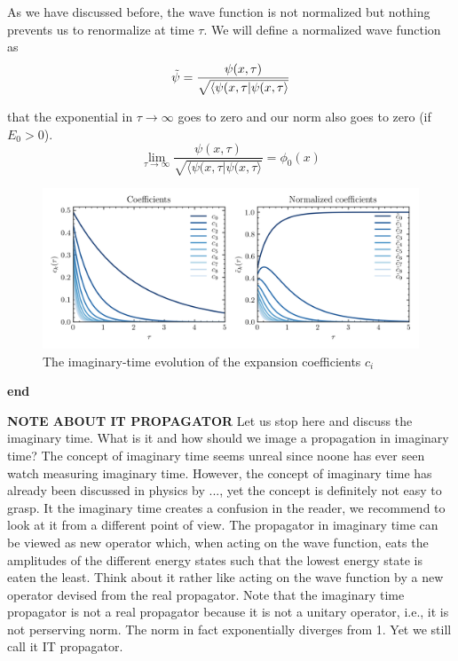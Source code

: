 As we have discussed before, the wave function is not normalized but nothing prevents us to renormalize at time $\tau$. We will define a normalized wave function as
\begin{equation}
    \Tilde{\psi} = \frac{\psi(x,\tau)}{\sqrt{\langle\psi(x,\tau | \psi(x,\tau \rangle}}
\end{equation}


 that the exponential in $\tau\to\infty$ goes to zero and our norm also goes to zero (if $E_0 > 0$). 
\begin{equation}
    \lim_{\tau\to\infty} \frac{\psi(x,\tau)}{\sqrt{\langle\psi(x,\tau | \psi(x,\tau \rangle}} = \phi_0(x)
\end{equation}

\begin{figure}[ht!]
    \centering
    \includegraphics[width=0.9\linewidth]{scriptum/obrazky/itqd/itqd1.png}
    \caption{The imaginary-time evolution of the expansion coefficients $c_i$}
    \label{fig:itqd1}
\end{figure}




\textbf{end}

\vspace{2cm}


\textbf{NOTE ABOUT IT PROPAGATOR}
Let us stop here and discuss the imaginary time. What is it and how should we image a propagation in imaginary time? The concept of imaginary time seems unreal since noone has ever seen watch measuring imaginary time. However, the concept of imaginary time has already been discussed in physics by ..., yet the concept is definitely not easy to grasp. It the imaginary time creates a confusion in the reader, we recommend to look at it from a different point of view. The propagator in imaginary time can be viewed as new operator which, when acting on the wave function, eats the amplitudes of the different energy states such that the lowest energy state is eaten the least. Think about it rather like acting on the wave function by a new operator devised from the real propagator. Note that the imaginary time propagator is not a real propagator because it is not a unitary operator, i.e., it is not perserving norm. The norm in fact exponentially diverges from 1. Yet we still call it IT propagator.

